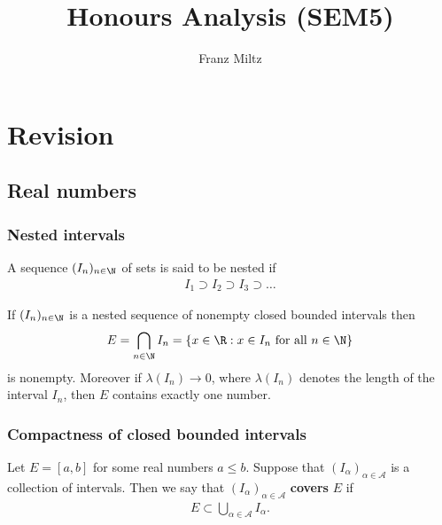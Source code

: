 \documentclass{article}
\begin{document}
\mkthmstwounified
\title{Honours Analysis (SEM5)}
\author{Franz Miltz}
\maketitle
\tableofcontents
\pagebreak

\section{Revision}

\subsection{Real numbers}

\subsubsection{Nested intervals}

\begin{definition}
	A sequence $(I_n)_{n\in\N}$ of sets is said to be nested if
	\begin{align*}
		I_1 \supset I_2 \supset I_3 \supset \dots
	\end{align*}
\end{definition}

\begin{theorem}
	If $(I_n)_{n\in\N}$ is a nested sequence of nonempty closed bounded intervals then
	\begin{align*}
		E=\bigcap_{n\in\N} I_n = \{x\in\R : x \in I_n \text{ for all } n\in\N\}
	\end{align*}
	is nonempty.
	Moreover if $\lambda(I_n)\to 0$, where $\lambda(I_n)$ denotes the length of the
	interval $I_n$, then $E$ contains exactly one number.
\end{theorem}

\subsubsection{Compactness of closed bounded intervals}

\begin{definition}
	Let $E=[a,b]$ for some real numbers $a\leq b$. Suppose that $(I_\alpha)_{\alpha\in\mathcal{A}}$
	is a collection of intervals. Then we say that $(I_\alpha)_{\alpha\in\mathcal{A}}$ \textbf{covers}
	$E$ if
	\begin{align*}
		E \subset \bigcup_{\alpha \in \mathcal{A}} I_\alpha.
	\end{align*}
\end{definition}
\end{document}
